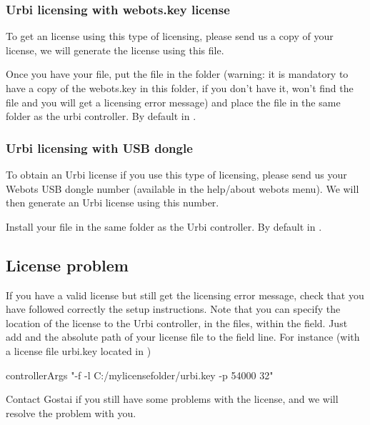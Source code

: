 \subsubsection{Urbi licensing with webots.key license}

To get an \urbi license using this type of licensing, please send us a
copy of your  license, we will generate the \urbi
license using this file.

Once you have your  file, put the 
file in the folder  (warning: it is mandatory
to have a copy of the webots.key in this folder, if you don't have it,
\urbi won't find the  file and you will get a
licensing error message) and place the  file in the
same folder as the urbi controller. By default in
.


\subsubsection{Urbi licensing with USB dongle}

To obtain an Urbi license if you use this type of licensing, please
send us your Webots USB dongle number (available in the help/about
webots menu). We will then generate an Urbi license using this number.

Install your  file in the same folder as the Urbi
controller.  By default in
.

\subsection{License problem}

If you have a valid license but still get the licensing error message,
check that you have followed correctly the setup instructions. Note
that you can specify the location of the  license to
the Urbi controller, in the  files, within the
 field. Just add  and the absolute
path of your license file to the field line. For instance (with a
license file urbi.key located in )

\begin{shell}
controllerArgs "-f -l C:/mylicensefolder/urbi.key  -p 54000 32"
\end{shell}

Contact Gostai if you still have some problems with the license, and
we will resolve the problem with you.

